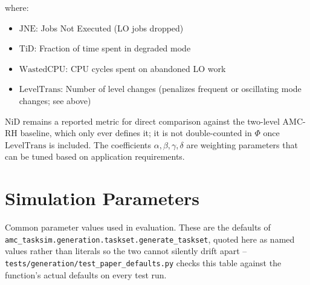 where:
\begin{itemize}
    \item $\mathrm{JNE}$: Jobs Not Executed (LO jobs dropped)
    \item $\mathrm{TiD}$: Fraction of time spent in degraded mode
    \item $\mathrm{WastedCPU}$: CPU cycles spent on abandoned LO work
    \item $\mathrm{LevelTrans}$: Number of level changes (penalizes frequent or oscillating mode changes; see above)
\end{itemize}
$\mathrm{NiD}$ remains a reported metric for direct comparison against the
two-level AMC-RH baseline, which only ever defines it; it is not
double-counted in $\Phi$ once $\mathrm{LevelTrans}$ is included.
The coefficients $\alpha, \beta, \gamma, \delta$ are weighting parameters that can be tuned based on
application requirements.

\section{Simulation Parameters}

Common parameter values used in evaluation. These are the defaults of
\texttt{amc\_tasksim.generation.taskset.generate\_taskset}, quoted here as
named values rather than literals so the two cannot silently drift apart --
\texttt{tests/generation/test\_paper\_defaults.py} checks this table against
the function's actual defaults on every test run.

